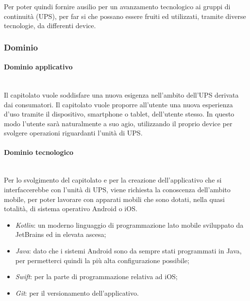 \documentclass[11pt]{article}
\begin{document}
    Per poter quindi fornire ausilio per un avanzamento tecnologico ai gruppi di continuità (UPS), per far si che possano essere
    fruiti ed utilizzati, tramite diverse tecnologie, da differenti device.
    
    \subsubsection{Dominio}
        \paragraph{Dominio applicativo}~\\
        
        \noindent
        Il capitolato vuole soddisfare una nuova esigenza nell'ambito dell'UPS derivata dai consumatori.
        Il capitolato vuole proporre all’utente una nuova esperienza d'uso tramite il dispositivo, smartphone o
        tablet, dell'utente stesso.
        In questo modo l'utente sarà naturalmente a suo agio, utilizzando il proprio device per svolgere operazioni riguardanti l'unità
        di UPS.
        
        \paragraph{Dominio tecnologico}~\\
        
        \noindent
        Per lo svolgimento del capitolato e per la creazione dell'applicativo che si interfaccerebbe con l'unità di UPS, viene
        richiesta la conoscenza dell'ambito mobile, per poter lavorare con apparati mobili che sono dotati, nella quasi totalità, di
        sistema operativo Android o iOS.
       
        \begin{itemize}
            \item \textit{Kotlin}: un moderno linguaggio di programmazione lato mobile sviluppato da JetBrains ed in elevata ascesa;
            \item \textit{Java}: dato che i sistemi Android sono da sempre stati programmati in Java, per permetterci quindi la più
            alta configurazione possibile;
            \item \textit{Swift}: per la parte di programmazione relativa ad iOS;
            \item \textit{Git}: per il versionamento dell'applicativo.
        \end{itemize}
    
\end{document}
